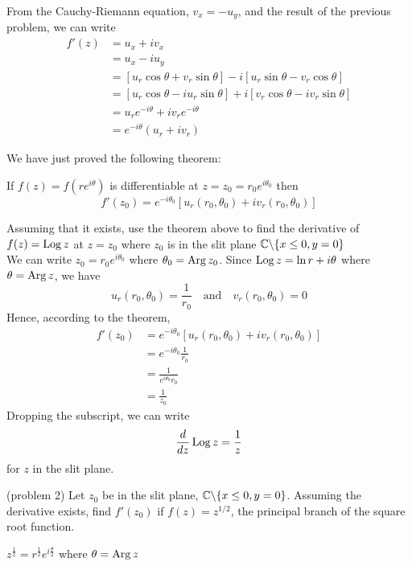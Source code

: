 \documentclass[handout]{ximera}
\begin{document}
From the Cauchy-Riemann equation, $v_x = -u_y$, and the result of the previous problem, we can write
\begin{align*}
f'(z) &= u_x + iv_x\\
      & = u_x - iu_y\\
      &= \left[u_r \cos \theta + v_r \sin \theta\right] - i\left[ u_r \sin \theta - v_r \cos \theta \right]\\
      &= \left[u_r \cos \theta -i u_r \sin \theta\right] + i\left[ v_r \cos \theta  - iv_r \sin \theta\right]\\
      &= u_r e^{-i\theta} + iv_r e^{-i\theta}\\
      &=  e^{-i\theta}(u_r +iv_r)
\end{align*}

We have just proved the following theorem:

\begin{theorem}
If $f(z) = f\left(re^{i\theta}\right)$ is differentiable at $z = z_0 = r_0 e^{i\theta_0}$ then
\[
f'(z_0) = e^{-i\theta_0} \left[u_r(r_0, \theta_0) + iv_r(r_0, \theta_0)\right]
\]
\end{theorem}

\begin{example}[example 2]
Assuming that it exists, use the theorem above to find the derivative of $f(z) = \operatorname{Log} z$ 
at $z = z_0$ where $z_0$ is in the 
slit plane $\mathbb C \backslash \{x\leq 0, y=0\}$ \\
We can write $z_0 = r_0 e^{i\theta_0}$ where $\theta_0 = \operatorname{Arg} z_0$. Since $\operatorname{Log} z = \ln r + i\theta$
where $\theta = \operatorname{Arg} z$, we have 
\[
u_r(r_0,\theta_0) = \frac{1}{r_0} \quad \mbox{and} \quad v_r(r_0,\theta_0) = 0
\]
Hence, according to the theorem,
\begin{align*}
f'(z_0) &= e^{-i\theta_0}[u_r(r_0,\theta_0)+iv_r(r_0,\theta_0)] \\
        &= e^{-i\theta_0}\frac{1}{r_0}\\
        &= \frac{1}{e^{i\theta_0}r_0}\\
        &= \frac{1}{z_0}
\end{align*}
Dropping the subscript, we can write
\[
\frac{d}{dz} \operatorname{Log} z = \frac{1}{z}
\]
for $z$ in the slit plane.
\end{example}

\begin{problem}(problem 2)
Let $z_0$ be in the slit plane, $\mathbb C \backslash \{x\leq 0, y=0\}$. 
Assuming the derivative exists, find $f'(z_0)$ if $f(z) = z^{1/2}$, 
the principal branch of the square root function.
\begin{hint}
$\displaystyle z^{\frac12} = r^{\frac12}e^{i\frac{\theta}{2}}$ where $\theta = \operatorname{Arg} z$
\end{hint}
\end{problem}
\end{document}
